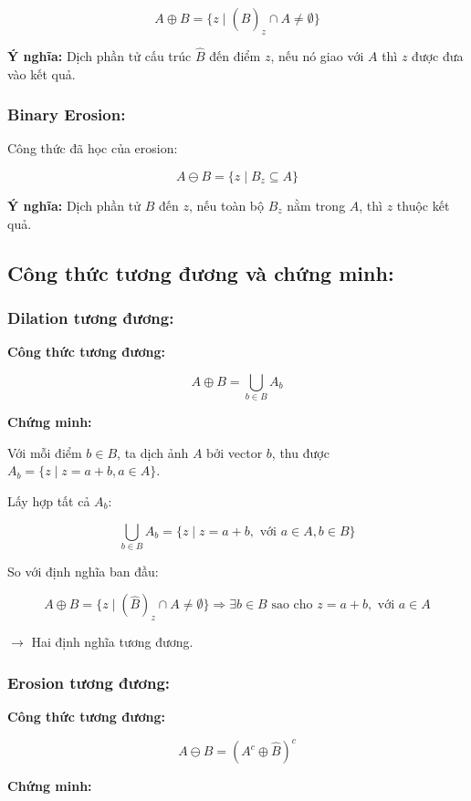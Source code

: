 \documentclass[12pt]{article}
\begin{document}
	\[
	A \oplus B = \{ z \mid (\hat{B})_z \cap A \neq \emptyset \}
	\]
	
	\textbf{Ý nghĩa:} Dịch phần tử cấu trúc $\hat{B}$ đến điểm $z$, nếu nó giao với $A$ thì $z$ được đưa vào kết quả.
	
	\subsubsection*{Binary Erosion:}
	
	Công thức đã học của erosion:
	
	\[
	A \ominus B = \{ z \mid B_z \subseteq A \}
	\]
	
	\textbf{Ý nghĩa:} Dịch phần tử $B$ đến $z$, nếu toàn bộ $B_z$ nằm trong $A$, thì $z$ thuộc kết quả.
	
	\subsection*{Công thức tương đương và chứng minh:}
	\subsubsection*{Dilation tương đương:}
	
	\textbf{Công thức tương đương:}
	
	\[
	A \oplus B = \bigcup_{b \in B} A_b
	\]
	
	\textbf{Chứng minh:}
	
	Với mỗi điểm $b \in B$, ta dịch ảnh $A$ bởi vector $b$, thu được $A_b = \{ z \mid z = a + b, a \in A \}$.
	
	Lấy hợp tất cả $A_b$:
	
	\[
	\bigcup_{b \in B} A_b = \{ z \mid z = a + b, \text{ với } a \in A, b \in B \}
	\]
	
	So với định nghĩa ban đầu:
	
	\[
	A \oplus B = \{ z \mid (\hat{B})_z \cap A \neq \emptyset \}
	\Rightarrow \exists b \in B \text{ sao cho } z = a + b, \text{ với } a \in A
	\]
	
	$\rightarrow$ Hai định nghĩa tương đương.
	
	\subsubsection*{Erosion tương đương:}
	\textbf{Công thức tương đương:}
	
	\[
	A \ominus B = \left( A^c \oplus \hat{B} \right)^c
	\]
	
	\textbf{Chứng minh:}
	
\end{document}
